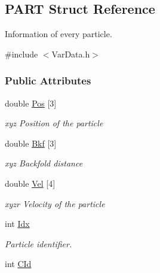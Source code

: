 \hypertarget{structPART}{\subsection{\-P\-A\-R\-T \-Struct \-Reference}
\label{structPART}
}


\-Information of every particle.  




{\ttfamily \#include $<$\-Var\-Data.\-h$>$}

\subsubsection*{\-Public \-Attributes}
\begin{DoxyCompactItemize}
\item 
\hypertarget{structPART_a863738e46f14b3bfc674ad87d35f143d}{double \hyperlink{structPART_a863738e46f14b3bfc674ad87d35f143d}{\-Pos} \mbox{[}3\mbox{]}}\label{structPART_a863738e46f14b3bfc674ad87d35f143d}

\begin{DoxyCompactList}\small\item\em xyz \-Position of the particle \end{DoxyCompactList}\item 
\hypertarget{structPART_a77abbc20fd99f1fb464e7a922e543e19}{double \hyperlink{structPART_a77abbc20fd99f1fb464e7a922e543e19}{\-Bkf} \mbox{[}3\mbox{]}}\label{structPART_a77abbc20fd99f1fb464e7a922e543e19}

\begin{DoxyCompactList}\small\item\em xyz \-Backfold distance \end{DoxyCompactList}\item 
\hypertarget{structPART_afd1b3747170c238c06ba3420cbc5c2a2}{double \hyperlink{structPART_afd1b3747170c238c06ba3420cbc5c2a2}{\-Vel} \mbox{[}4\mbox{]}}\label{structPART_afd1b3747170c238c06ba3420cbc5c2a2}

\begin{DoxyCompactList}\small\item\em xyzr \-Velocity of the particle \end{DoxyCompactList}\item 
\hypertarget{structPART_a26c51826a2d187b6baa0f5f249436abe}{int \hyperlink{structPART_a26c51826a2d187b6baa0f5f249436abe}{\-Idx}}\label{structPART_a26c51826a2d187b6baa0f5f249436abe}

\begin{DoxyCompactList}\small\item\em \-Particle identifier. \end{DoxyCompactList}\item 
\hypertarget{structPART_ae9c6df97c72d6a4af74acf24adbe81bf}{int \hyperlink{structPART_ae9c6df97c72d6a4af74acf24adbe81bf}{\-C\-Id}}\label{structPART_ae9c6df97c72d6a4af74acf24adbe81bf}


\end{DoxyCompactItemize}
